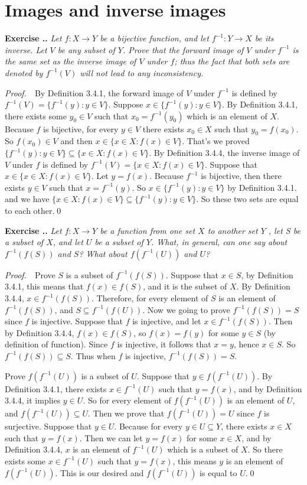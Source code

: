 \documentclass{book}
\newcommand{\pff}{\vspace{.25em}\noindent\emph{Proof.}~~}
\newcounter{Exercise}[section]
\renewcommand{\theExercise}{\thesection.\arabic{Exercise}.}
\newcommand{\new}{\vspace{1.5em}\noindent\textbf{{Exercise \stepcounter{Exercise}\textbf{\theExercise}}} }
\begin{document}
\section{Images and inverse images}

\new\emph{Let $f:X\to Y$ be a bijective function, and let $f^{-1}:Y\to X$ be its inverse. Let $V$ be any subset of $Y$. Prove that the forward image of $V$ under $f^{-1}$ is the same set as the inverse image of $V$ under $f$; thus the fact that both sets are denoted by $f^{-1}(V)$ will not lead to any inconsistency.}

\pff By Definition 3.4.1, the forward image of $V$ under $f^{-1}$ is defined by $f^{-1}(V)=\{f^{-1}(y):y\in V\}$. Suppose $x\in\{f^{-1}(y):y\in V\}$. By Definition 3.4.1, there exists some $y_0\in V$ such that $x_0=f^{-1}(y_0)$ which is an element of $X$. Because $f$ is bijective, for every $y\in V$ there exists $x_0\in X$ such that $y_0=f(x_0)$. So $f(x_0)\in V$ and then $x\in\{x\in X:f(x)\in V\}$. That's we proved $\{f^{-1}(y):y\in V\}\subseteq\{x\in X:f(x)\in V\}$. By Definition 3.4.4, the inverse image of $V$ under $f$ is defined by $f^{-1}(V)=\{x\in X:f(x)\in V\}$. Suppose that $x\in\{x\in X:f(x)\in V\}$. Let $y=f(x)$. Because $f^{-1}$ is bijective, then there exists $y\in V$ such that $x=f^{-1}(y)$. So $x\in\{f^{-1}(y):y\in V\}$ by Definition 3.4.1. and we have $\{x\in X:f(x)\in V\}\subseteq\{f^{-1}(y):y\in V\}$. So these two sets are equal to each other.\qed

\new\emph{Let $f:X\to Y$ be a function from one set $X$ to another set $Y$ , let S be a subset of $X$, and let $U$ be a subset of $Y$. What, in general, can one say about $f^{-1}(f(S))$ and $S$? What about $f(f^{-1}(U))$ and $U$?}

\pff Prove $S$ is a subset of $f^{-1}(f(S))$. Suppose that $x\in S$, by Definition 3.4.1, this means that $f(x)\in f(S)$, and it is the subset of $X$. By Definition 3.4.4, $x\in f^{-1}(f(S))$. Therefore, for every element of $S$ is an element of $f^{-1}(f(S))$, and $S\subseteq f^{-1}(f(U))$. Now we going to prove $f^{-1}(f(S))=S$ since $f$ is injective. Suppose that $f$ is injective, and let $x\in f^{-1}(f(S))$. Then by Definition 3.4.4, $f(x)\in f(S)$, so $f(x)=f(y)$ for some $y\in S$ (by definition of function). Since $f$ is injective, it follows that $x=y$, hence $x\in S$. So $f^{-1}(f(S))\subseteq S$. Thus when $f$ is injective, $f^{-1}(f(S))=S$.

Prove $f(f^{-1}(U))$ is a subset of $U$. Suppose that $y\in f(f^{-1}(U))$. By Definition 3.4.1, there exists $x\in f^{-1}(U)$ such that $y=f(x)$, and by Definition 3.4.4, it implies $y\in U$. So for every element of $f(f^{-1}(U))$ is an element of $U$, and $f(f^{-1}(U))\subseteq U$. Then we prove that $f(f^{-1}(U))=U$ since $f$ is surjective. Suppose that $y\in U$. Because for every $y\in U\subseteq Y$, there exists $x\in X$ such that $y=f(x)$. Then we can let $y=f(x)$ for some $x\in X$, and by Definition 3.4.4, $x$ is an element of $f^{-1}(U)$ which is a subset of $X$. So there exists some $x\in f^{-1}(U)$ such that $y=f(x)$, this means $y$ is an element of $f(f^{-1}(U))$. This is our desired and $f(f^{-1}(U))$ is equal to $U$.\qed
\end{document}
